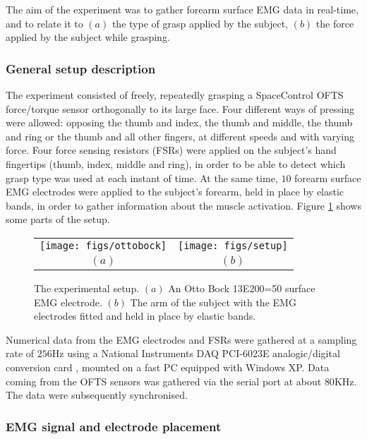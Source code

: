The aim of the experiment was to gather forearm surface EMG data in
real-time, and to relate it to $(a)$ the type of grasp applied by the
subject, $(b)$ the force applied by the subject while grasping.

\subsubsection{General setup description}

The experiment consisted of freely, repeatedly grasping a
SpaceControl OFTS force/torque sensor \cite{ofts} orthogonally to
its large face. Four different ways of pressing were allowed:
opposing the thumb and index, the thumb and middle, the thumb and
ring or the thumb and all other fingers, at different speeds and
with varying force. Four force sensing resistors (FSRs) were
applied on the subject's hand fingertips (thumb, index, middle and
ring), in order to be able to detect which grasp type was used at
each instant of time. At the same time, $10$ forearm surface EMG
electrodes were applied to the subject's forearm, held in place by
elastic bands, in order to gather information about the muscle
activation. Figure \ref{fig:setup} shows some parts of the setup.

\begin{figure} \centering
  \begin{tabular}{cc}
    \texttt{[image: figs/ottobock]} &
    \texttt{[image: figs/setup]} \\
    $(a)$ & $(b)$\\
  \end{tabular}
  \caption{The experimental setup. $(a)$ An Otto Bock 13E200=50
    surface EMG electrode. $(b)$
    The arm of the subject with the EMG electrodes fitted and held in
    place by elastic bands.}
  \label{fig:setup}
\end{figure}

Numerical data from the EMG electrodes and FSRs were gathered at a
sampling rate of $256$Hz using a National Instruments DAQ
PCI-6023E analogic/digital conversion card \cite{nidaq}, mounted
on a fast PC equipped with Windows XP. Data coming from the OFTS
sensors was gathered via the serial port at about $80$KHz. The
data were subsequently synchronised.

\subsubsection{EMG signal and electrode placement}

